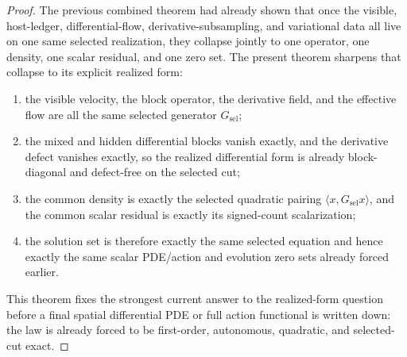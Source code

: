\begin{proof}
The previous combined theorem had already shown that once the visible,
host-ledger, differential-flow, derivative-subsampling, and variational
data all live on one same selected realization, they collapse jointly to
one operator, one density, one scalar residual, and one zero set. The present
theorem sharpens that collapse to its explicit realized form:
\begin{enumerate}
\item the visible velocity, the block operator, the derivative field, and the
      effective flow are all the same selected generator \(G_{\mathrm{sel}}\);
\item the mixed and hidden differential blocks vanish exactly, and the
      derivative defect vanishes exactly, so the realized differential form
      is already block-diagonal and defect-free on the selected cut;
\item the common density is exactly the selected quadratic pairing
      \(\langle x,G_{\mathrm{sel}}x\rangle\), and the common scalar residual is
      exactly its signed-count scalarization;
\item the solution set is therefore exactly the same selected
      equation and hence exactly the same scalar PDE/action and evolution zero
      sets already forced earlier.
\end{enumerate}
This theorem fixes the strongest current answer to the realized-form question
before a final spatial differential PDE or full action functional is written
down: the law is already forced to be first-order, autonomous, quadratic, and
selected-cut exact.
\end{proof}

